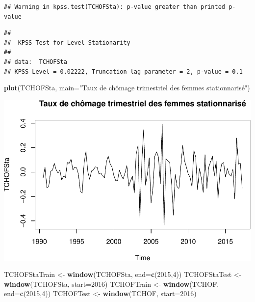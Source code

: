 \documentclass[11pt,]{article}
\newenvironment{Shaded}{\begin{snugshade}}{\end{snugshade}}
\newcommand{\KeywordTok}[1]{\textcolor[rgb]{0.13,0.29,0.53}{\textbf{{#1}}}}
\newcommand{\DataTypeTok}[1]{\textcolor[rgb]{0.13,0.29,0.53}{{#1}}}
\newcommand{\DecValTok}[1]{\textcolor[rgb]{0.00,0.00,0.81}{{#1}}}
\newcommand{\StringTok}[1]{\textcolor[rgb]{0.31,0.60,0.02}{{#1}}}
\newcommand{\NormalTok}[1]{{#1}}
\begin{document}
\begin{verbatim}
## Warning in kpss.test(TCHOFSta): p-value greater than printed p-value
\end{verbatim}

\begin{verbatim}
## 
##  KPSS Test for Level Stationarity
## 
## data:  TCHOFSta
## KPSS Level = 0.02222, Truncation lag parameter = 2, p-value = 0.1
\end{verbatim}

\begin{Shaded}
\begin{Highlighting}[]
  \KeywordTok{plot}\NormalTok{(TCHOFSta, }\DataTypeTok{main=}\StringTok{"Taux de chômage trimestriel des femmes stationnarisé"}\NormalTok{)}
\end{Highlighting}
\end{Shaded}

\includegraphics{doc_files/figure-latex/unnamed-chunk-9-2.pdf}

\begin{Shaded}
\begin{Highlighting}[]
  \NormalTok{TCHOFStaTrain <-}\StringTok{ }\KeywordTok{window}\NormalTok{(TCHOFSta, }\DataTypeTok{end=}\KeywordTok{c}\NormalTok{(}\DecValTok{2015}\NormalTok{,}\DecValTok{4}\NormalTok{))}
  \NormalTok{TCHOFStaTest <-}\StringTok{ }\KeywordTok{window}\NormalTok{(TCHOFSta, }\DataTypeTok{start=}\DecValTok{2016}\NormalTok{)}
  \NormalTok{TCHOFTrain <-}\StringTok{ }\KeywordTok{window}\NormalTok{(TCHOF, }\DataTypeTok{end=}\KeywordTok{c}\NormalTok{(}\DecValTok{2015}\NormalTok{,}\DecValTok{4}\NormalTok{))}
  \NormalTok{TCHOFTest <-}\StringTok{ }\KeywordTok{window}\NormalTok{(TCHOF, }\DataTypeTok{start=}\DecValTok{2016}\NormalTok{)}
\end{Highlighting}
\end{Shaded}
\end{document}

